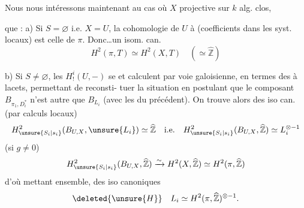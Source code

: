 Nous nous intéressons maintenant au
cas où $X$ projective  sur $k$ alg. clos, 

que : 
a) Si $S=\varnothing$ i.e. $X=U$, la cohomologie de $U$
à (coefficients dans les syst. locaux) est celle
de $\pi$. Donc\ldots un isom. can.
\[
H^2(\pi,T)\simeq H^2(X,T)\quad(\simeq\widehat{\mathbb Z})
\]

b) Si $S\ne\varnothing$, les $H^i_!(U,-)$ se 
et calculent par voie galoisienne, en termes
des   à lacets, permettant de reconsti-
tuer la situation
en postulant que le composant $B_{\pi_1,D_i^{*}}$
n'est autre que $B_{L_i}$ (avec les
 du  précédent). On
trouve alors des iso can. (par calculs locaux)
\[
H^2_{\unsure{S_i|s_i}}(B_{U,X},\unsure{L_i})\simeq\widehat{\mathbb Z}
\quad\text{i.e.}\quad
H^2_{\unsure{S_i|s_i}}(B_{U,X},\widehat{\mathbb Z})\simeq L_i^{\otimes-1}
\]
(si $g\ne0$)
\[
H^2_{\unsure{S_i|s_i}}(B_{U,X},\widehat{\mathbb Z})
\xrightarrow{\sim}H^2(X,\widehat{\mathbb Z})
\simeq H^2(\pi,\widehat{\mathbb Z})
\]
d'où   mettant ensemble, des iso
canoniques
\[
\deleted{\unsure{H}}\quad L_i\simeq H^2(\pi,\widehat{\mathbb Z})^{\otimes-1}.
\]
